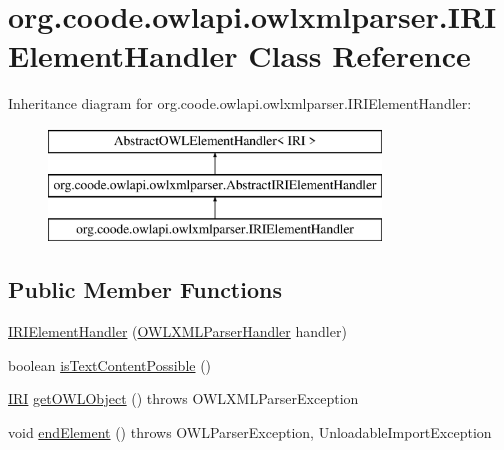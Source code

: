 \hypertarget{classorg_1_1coode_1_1owlapi_1_1owlxmlparser_1_1_i_r_i_element_handler}{\section{org.\-coode.\-owlapi.\-owlxmlparser.\-I\-R\-I\-Element\-Handler Class Reference}
\label{classorg_1_1coode_1_1owlapi_1_1owlxmlparser_1_1_i_r_i_element_handler}
}
Inheritance diagram for org.\-coode.\-owlapi.\-owlxmlparser.\-I\-R\-I\-Element\-Handler\-:\begin{figure}[H]
\begin{center}
\leavevmode
\includegraphics[height=3.000000cm]{classorg_1_1coode_1_1owlapi_1_1owlxmlparser_1_1_i_r_i_element_handler}
\end{center}
\end{figure}
\subsection*{Public Member Functions}
\begin{DoxyCompactItemize}
\item 
\hyperlink{classorg_1_1coode_1_1owlapi_1_1owlxmlparser_1_1_i_r_i_element_handler_a29c865c434066a9e5cb304c4986764bd}{I\-R\-I\-Element\-Handler} (\hyperlink{classorg_1_1coode_1_1owlapi_1_1owlxmlparser_1_1_o_w_l_x_m_l_parser_handler}{O\-W\-L\-X\-M\-L\-Parser\-Handler} handler)
\item 
boolean \hyperlink{classorg_1_1coode_1_1owlapi_1_1owlxmlparser_1_1_i_r_i_element_handler_a4e70bd429d5735f3e7fdd04272e9051f}{is\-Text\-Content\-Possible} ()
\item 
\hyperlink{classorg_1_1semanticweb_1_1owlapi_1_1model_1_1_i_r_i}{I\-R\-I} \hyperlink{classorg_1_1coode_1_1owlapi_1_1owlxmlparser_1_1_i_r_i_element_handler_ae406b10448beb6900e3e5ed1e1dc72f7}{get\-O\-W\-L\-Object} ()  throws O\-W\-L\-X\-M\-L\-Parser\-Exception 
\item 
void \hyperlink{classorg_1_1coode_1_1owlapi_1_1owlxmlparser_1_1_i_r_i_element_handler_a1285c1db07013d9550c31d1e9fe80da5}{end\-Element} ()  throws O\-W\-L\-Parser\-Exception, Unloadable\-Import\-Exception 
\end{DoxyCompactItemize}
